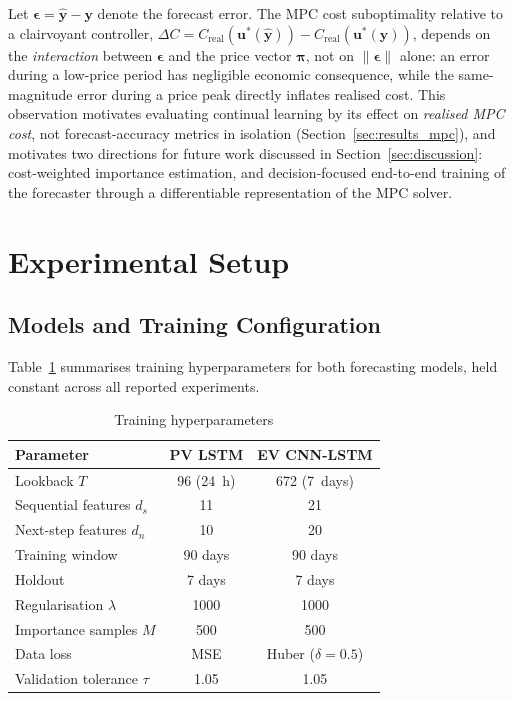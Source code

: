 \documentclass[journal]{IEEEtran}
\newcommand{\ewclambda}{\lambda}
\begin{document}
Let $\boldsymbol{\epsilon}=\hat{\mathbf{y}}-\mathbf{y}$ denote the
forecast error. The MPC cost suboptimality relative to a clairvoyant
controller, $\Delta C = C_{\mathrm{real}}(\mathbf{u}^*(\hat{\mathbf{y}}))
- C_{\mathrm{real}}(\mathbf{u}^*(\mathbf{y}))$, depends on the
\emph{interaction} between $\boldsymbol{\epsilon}$ and the price vector
$\boldsymbol{\pi}$, not on $\|\boldsymbol{\epsilon}\|$ alone: an error
during a low-price period has negligible economic consequence, while
the same-magnitude error during a price peak directly inflates realised
cost. This observation motivates evaluating continual learning by its
effect on \emph{realised MPC cost}, not forecast-accuracy metrics in
isolation (Section~\ref{sec:results_mpc}), and motivates two directions
for future work discussed in Section~\ref{sec:discussion}: cost-weighted
importance estimation, and decision-focused end-to-end training of the
forecaster through a differentiable representation of the MPC solver.

\section{Experimental Setup}
\label{sec:experimental}


\subsection{Models and Training Configuration}

Table~\ref{tab:hyperparams} summarises training hyperparameters for
both forecasting models, held constant across all reported experiments.

\begin{table}[t]
\centering
\caption{Training hyperparameters}
\label{tab:hyperparams}
\begin{tabular}{@{}lcc@{}}
\toprule
\textbf{Parameter} & \textbf{PV LSTM} & \textbf{EV CNN-LSTM} \\
\midrule
Lookback $T$ & 96 (24~h) & 672 (7~days) \\
Sequential features $d_s$ & 11 & 21 \\
Next-step features $d_n$ & 10 & 20 \\
Training window & 90 days & 90 days \\
Holdout & 7 days & 7 days \\
Regularisation $\ewclambda$ & 1000 & 1000 \\
Importance samples $M$ & 500 & 500 \\
Data loss & MSE & Huber ($\delta{=}0.5$) \\
Validation tolerance $\tau$ & 1.05 & 1.05 \\
\bottomrule
\end{tabular}
\end{table}
\end{document}
